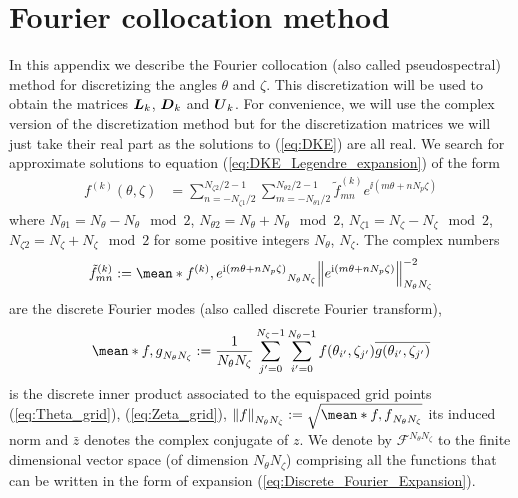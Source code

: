 \section{Fourier collocation method} \label{sec:Appendix_Fourier}

In this appendix we describe the Fourier collocation (also called pseudospectral) method for discretizing the angles $\theta$ and $\zeta$. This discretization will be used to obtain the matrices $\vb*{L}_k$, $\vb*{D}_k$ and $\vb*{U}_k$. For convenience, we will use the complex version of the discretization method but for the discretization matrices we will just take their real part as the solutions to (\ref{eq:DKE}) are all real. We search for approximate solutions to equation (\ref{eq:DKE_Legendre_expansion}) of the form
%
\begin{align}
	f^{(k)}(\theta,\zeta) 
	& = 
	\sum_{n=-N_{\zeta1}/2}^{N_{\zeta2}/2-1}
	\sum_{m=-N_{\theta1}/2}^{N_{\theta2}/2-1}
	\tilde{f}_{mn}^{(k)}
	e^{\ii(m\theta + nN_{p}\zeta)}
	\label{eq:Discrete_Fourier_Expansion}
\end{align}
where $N_{\theta1} = N_\theta - N_\theta\mod 2 $, $N_{\theta2} = N_\theta + N_\theta\mod 2 $, $N_{\zeta1} = N_\zeta - N_\zeta\mod 2 $, $N_{\zeta2} = N_\zeta + N_\zeta\mod 2 $ for some positive integers $N_\theta$, $N_\zeta$. The complex numbers 
%
\begin{align}
	\tilde{f}_{mn}^{(k)}
	:=
	\mean*{f^{(k)}, e^{\ii(m\theta + nN_{p}\zeta)}}_{N_\theta N_\zeta}
	\norm{ e^{\ii(m\theta + nN_{p}\zeta)}}_{N_\theta N_\zeta}^{-2}
	\label{eq:Discrete_Fourier_Transform}
\end{align}
are the discrete Fourier modes (also called discrete Fourier transform), 
%
\begin{align}
	\mean*{f,g}_{N_\theta N_\zeta}:= 
	\frac{1}{N_\theta N_\zeta}	
	\sum_{j'=0}^{N_{\zeta}-1}
	\sum_{i'=0}^{N_{\theta}-1}
	f(\theta_{i'},\zeta_{j'})
	\overline{g(\theta_{i'},\zeta_{j'})}
	\label{eq:Discrete_Fourier_Inner_product}
\end{align} 
is the discrete inner product associated to the equispaced grid points (\ref{eq:Theta_grid}), (\ref{eq:Zeta_grid}), $\norm{ f}_{N_\theta N_\zeta}:=\sqrt{\mean*{f,f}_{N_\theta N_\zeta}}$ its induced norm and $\bar{z}$ denotes the complex conjugate of $z$. We denote by $\mathcal{F}^{N_\theta N_\zeta}$ to the finite dimensional vector space (of dimension $N_\theta N_\zeta$) comprising all the functions that can be written in the form of expansion (\ref{eq:Discrete_Fourier_Expansion}).

